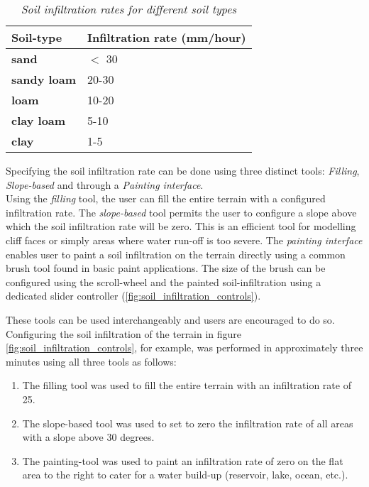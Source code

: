 \begin{table}[h]
  \centering
	    \begin{tabular}{|p{5cm}|p{8cm}|}
  	    \hline	
  	    \textbf{Soil-type} & \textbf{Infiltration rate (mm/hour)} \\
		\hline
		\textbf{sand} & $<$ 30 \\
		\hline
		\textbf{sandy loam} & 20-30 \\
		\hline
		\textbf{loam} & 10-20 \\
		\hline
		\textbf{clay loam} & 5-10 \\
		\hline
		\textbf{clay} & 1-5 \\
		\hline
		\end{tabular}
		\caption{\textit{Soil infiltration rates for different soil types} \protect\footnotemark}
	  \label{tab:soil_types}
\end{table}


Specifying the soil infiltration rate can be done using three distinct tools: \textit{Filling}, \textit{Slope-based} and through a \textit{Painting interface}.\\
Using the \textit{filling} tool, the user can fill the entire terrain with a configured infiltration rate.
The \textit{slope-based} tool permits the user to configure a slope above which the soil infiltration rate will be zero. This is an efficient tool for modelling cliff faces or simply areas where water run-off is too severe. The \textit{painting interface} enables user to paint a soil infiltration on the terrain directly using a common brush tool found in basic paint applications. The size of the brush can be configured using the scroll-wheel and the painted soil-infiltration using a dedicated slider controller (\ref{fig:soil_infiltration_controls}).

These tools can be used interchangeably and users are encouraged to do so. Configuring the soil infiltration of the terrain in figure \ref{fig:soil_infiltration_controls}, for example, was performed in approximately three minutes using all three tools as follows:
\begin{enumerate}
\item The filling tool was used to fill the entire terrain with an infiltration rate of 25.\\
\item The slope-based tool was used to set to zero the infiltration rate of all areas with a slope above 30 degrees.\\
\item The painting-tool was used to paint an infiltration rate of zero on the flat area to the right to cater for a water build-up (reservoir, lake, ocean, etc.).\\
\end{enumerate}


